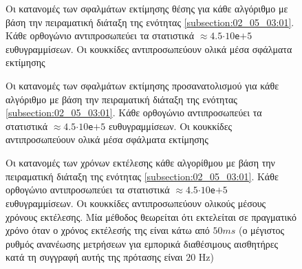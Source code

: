 \begin{figure}\vspace{1cm}\hspace{0.5cm}
  
  \vspace{-4cm}
  \caption{\small Οι κατανομές των σφαλμάτων εκτίμησης θέσης για κάθε αλγόριθμο
           με βάση την πειραματική διάταξη της ενότητας
           \ref{subsection:02_05_03:01}. Κάθε ορθογώνιο αντιπροσωπεύει τα
           στατιστικά $\approx 4.5$$\cdot$$10$\texttt{e}$+$$5$ ευθυγραμμίσεων.
           Οι κουκκίδες αντιπροσωπεύουν ολικά μέσα σφάλματα εκτίμησης}
  \label{fig:02_05_03:02:01}
\end{figure}

\begin{figure}\vspace{1cm}\hspace{0.5cm}
  
  \vspace{-4cm}
  \caption{\small Οι κατανομές των σφαλμάτων εκτίμησης προσανατολισμού για κάθε
           αλγόριθμο με βάση την πειραματική διάταξη της ενότητας
           \ref{subsection:02_05_03:01}. Κάθε ορθογώνιο αντιπροσωπεύει τα
           στατιστικά $\approx 4.5$$\cdot$$10$\texttt{e}$+$$5$ ευθυγραμμίσεων.
           Οι κουκκίδες αντιπροσωπεύουν ολικά μέσα σφάλματα εκτίμησης}
  \label{fig:02_05_03:02:02}
\end{figure}

\begin{figure}\vspace{1cm}\hspace{0.5cm}
  
  \vspace{-4cm}
  \caption{\small Οι κατανομές των χρόνων εκτέλεσης κάθε
           αλγορίθμου με βάση την πειραματική διάταξη της ενότητας
           \ref{subsection:02_05_03:01}. Κάθε ορθογώνιο αντιπροσωπεύει τα
           στατιστικά $\approx 4.5$$\cdot$$10$\texttt{e}$+$$5$ ευθυγραμμίσεων.
           Οι κουκκίδες αντιπροσωπεύουν ολικούς μέσους χρόνους εκτέλεσης.
           Μία μέθοδος θεωρείται ότι εκτελείται σε πραγματικό χρόνο όταν ο
           χρόνος εκτέλεσής της είναι κάτω από $50ms$ (ο μέγιστος ρυθμός
           ανανέωσης μετρήσεων για εμπορικά διαθέσιμους αισθητήρες κατά τη
           συγγραφή αυτής της πρότασης είναι $20$ Hz)}
  \label{fig:02_05_03:02:03}
\end{figure}


